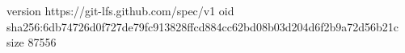 version https://git-lfs.github.com/spec/v1
oid sha256:6db74726d0f727de79fc913828ffcd884cc62bd08b03d204d6f2b9a72d56b21c
size 87556
